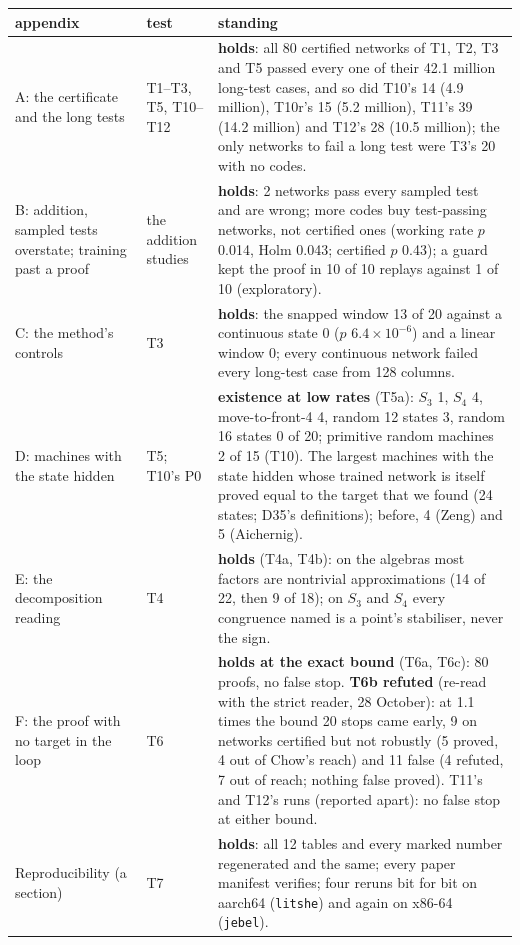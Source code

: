 \documentclass[11pt]{article}
\begin{document}
\begin{center}
\small
\begin{tabularx}{\textwidth}{p{}lX}
\toprule
appendix & test & standing \\
\midrule
A: the certificate and the long tests & T1--T3, T5, T10--T12 & \textbf{holds}: all 80 certified
networks of T1, T2, T3 and T5 passed every one of their 42.1 million long-test cases, and so did T10's
14 (4.9 million), T10r's 15 (5.2 million), T11's 39 (14.2 million) and T12's 28 (10.5 million); the
only networks to fail a long test were T3's 20 with no codes. \\
B: addition, sampled tests overstate; training past a proof & the addition studies & \textbf{holds}:
2 networks pass every sampled test and are wrong; more codes buy test-passing networks, not
certified ones (working rate $p$ 0.014, Holm 0.043; certified $p$ 0.43); a guard kept the proof in
10 of 10 replays against 1 of 10 (exploratory). \\
C: the method's controls & T3 & \textbf{holds}: the snapped window 13 of 20 against a continuous
state 0 ($p$ $6.4 \times 10^{-6}$) and a linear window 0; every continuous network failed every
long-test case from 128 columns. \\
D: machines with the state hidden & T5; T10's P0 & \textbf{existence at low rates} (T5a): $S_3$ 1,
$S_4$ 4, move-to-front-4 4, random 12 states 3, random 16 states 0 of 20; primitive random machines 2
of 15 (T10). The largest machines with the state hidden whose trained network is itself proved
equal to the target that we found (24 states; D35's definitions); before, 4 (Zeng) and 5
(Aichernig). \\
E: the decomposition reading & T4 & \textbf{holds} (T4a, T4b): on
the algebras most factors are nontrivial approximations (14 of 22, then 9 of 18); on $S_3$ and $S_4$
every congruence named is a point's stabiliser, never the sign. \\
F: the proof with no target in the loop & T6 & \textbf{holds at the exact bound} (T6a, T6c): 80
proofs, no false stop. \textbf{T6b refuted} (re-read with the strict reader, 28 October): at 1.1
times the bound 20 stops came early, 9 on networks certified but not robustly (5 proved, 4 out of
Chow's reach) and 11 false (4 refuted, 7 out of reach; nothing false proved). T11's and T12's runs
(reported apart): no false stop at either bound. \\
Reproducibility (a section) & T7 & \textbf{holds}: all 12 tables and every marked number
regenerated and the same; every paper manifest verifies; four reruns bit for bit on aarch64 (\texttt{litshe}) and again on x86-64 (\texttt{jebel}). \\
\bottomrule
\end{tabularx}
\end{center}
\end{document}
